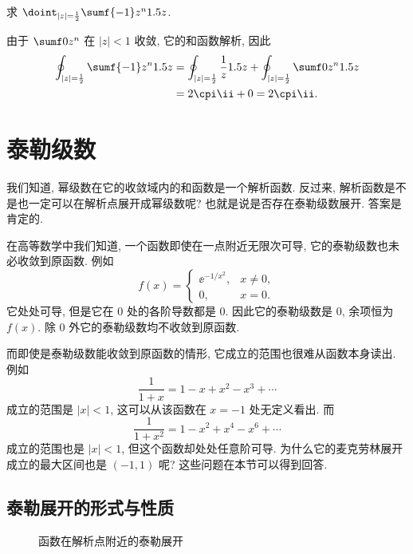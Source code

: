 \begin{example}
  求 $\doint_{|z|=\half} \sumf{-1} z^n\d z$.
\end{example}

\begin{solution}
  由于 $\sumf0 z^n$ 在 $|z|<1$ 收敛, 它的和函数解析, 因此
  \begin{align*}
     \oint_{|z|=\half} \sumf{-1} z^n\d z&
    =\oint_{|z|=\half}\frac1z\d z
      +\oint_{|z|=\half} \sumf0 z^n\d z\\&
    =2\cpi\ii +0
    =2\cpi\ii.
  \end{align*}
\end{solution}



\section{泰勒级数}

我们知道, 幂级数在它的收敛域内的和函数是一个解析函数.
反过来, 解析函数是不是也一定可以在解析点展开成幂级数呢? 也就是说是否存在泰勒级数展开. 答案是肯定的.

在高等数学中我们知道, 一个函数即使在一点附近无限次可导, 它的泰勒级数也未必收敛到原函数.
例如
\[
  f(x)=\begin{cases}
    \ee^{-1/x^2},&x\neq 0,\\
    0,&x=0.
  \end{cases}
\]
它处处可导, 但是它在 $0$ 处的各阶导数都是 $0$.
因此它的泰勒级数是 $0$, 余项恒为 $f(x)$.
除 $0$ 外它的泰勒级数均不收敛到原函数.

而即使是泰勒级数能收敛到原函数的情形, 它成立的范围也很难从函数本身读出.
例如
\[
  \dfrac1{1+x}=1-x+x^2-x^3+\cdots
\]
成立的范围是 $|x|<1$, 这可以从该函数在 $x=-1$ 处无定义看出.
而
\[
  \dfrac1{1+x^2}=1-x^2+x^4-x^6+\cdots
\]
成立的范围也是 $|x|<1$, 但这个函数却处处任意阶可导.
为什么它的麦克劳林展开成立的最大区间也是 $(-1,1)$ 呢?
这些问题在本节可以得到回答.


\subsection{泰勒展开的形式与性质}

\begin{figure}[!htb]
  \centering
  \caption{函数在解析点附近的泰勒展开}
\end{figure}

